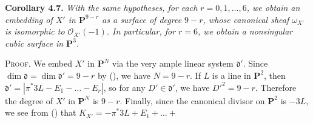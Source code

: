 {\medskip
\noindent\hypertarget{result-V-4.7}{}\textbf{Corollary 4.7.} \emph{With the same hypotheses, for each $r=0,1,\dots,6$, we obtain an embedding of $X'$ in $\mathbf P^{9-r}$ as a surface of degree $9-r$, whose canonical sheaf $\omega_{X'}$ is isomorphic to $\mathcal O_{X'}(-1)$. In particular, for $r=6$, we obtain a nonsingular cubic surface in $\mathbf P^3$.}

\smallskip
\noindent\textsc{Proof.} We embed $X'$ in $\mathbf P^N$ via the very ample linear system $\mathfrak d'$. Since $\dim\mathfrak d=\dim\mathfrak d'=9-r$ by (), we have $N=9-r$. If $L$ is a line in $\mathbf P^2$, then $\mathfrak d'=|\pi^*3L-E_1-\dots-E_r|$, so for any $D'\in\mathfrak d'$, we have $D'^2=9-r$. Therefore the degree of $X'$ in $\mathbf P^N$ is $9-r$. Finally, since the canonical divisor on $\mathbf P^2$ is $-3L$, we see from () that $K_{X'}=-\pi^*3L+E_1+\dots+{}$}
